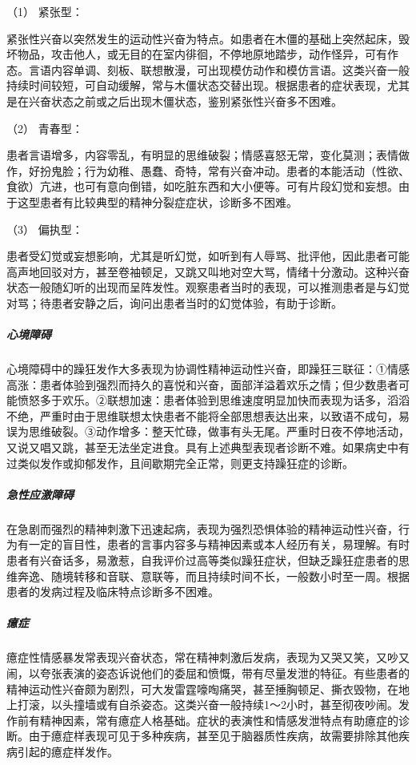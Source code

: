 \hypertarget{text00043.htmlux5cux23CHP1-18-1-2-1-1}{}
（1） 紧张型：

紧张性兴奋以突然发生的运动性兴奋为特点。如患者在木僵的基础上突然起床，毁坏物品，攻击他人，或无目的在室内徘徊，不停地原地踏步，动作怪异，可有作态。言语内容单调、刻板、联想散漫，可出现模仿动作和模仿言语。这类兴奋一般持续时间较短，可自动缓解，常与木僵状态交替出现。根据患者的症状表现，尤其是在兴奋状态之前或之后出现木僵状态，鉴别紧张性兴奋多不困难。

\hypertarget{text00043.htmlux5cux23CHP1-18-1-2-1-2}{}
（2） 青春型：

患者言语增多，内容零乱，有明显的思维破裂；情感喜怒无常，变化莫测；表情做作，好扮鬼脸；行为幼稚、愚蠢、奇特，常有兴奋冲动。患者的本能活动（性欲、食欲）亢进，也可有意向倒错，如吃脏东西和大小便等。可有片段幻觉和妄想。由于这型患者有比较典型的精神分裂症症状，诊断多不困难。

\hypertarget{text00043.htmlux5cux23CHP1-18-1-2-1-3}{}
（3） 偏执型：

患者受幻觉或妄想影响，尤其是听幻觉，如听到有人辱骂、批评他，因此患者可能高声地回驳对方，甚至卷袖顿足，又跳又叫地对空大骂，情绪十分激动。这种兴奋状态一般随幻听的出现而呈阵发性。观察患者当时的表现，可以推测患者是与幻觉对骂；待患者安静之后，询问出患者当时的幻觉体验，有助于诊断。

\subparagraph{心境障碍}

心境障碍中的躁狂发作大多表现为协调性精神运动性兴奋，即躁狂三联征：①情感高涨：患者体验到强烈而持久的喜悦和兴奋，面部洋溢着欢乐之情；但少数患者可能愤怒多于欢乐。②联想加速：患者体验到思维速度明显加快而表现为话多，滔滔不绝，严重时由于思维联想太快患者不能将全部思想表达出来，以致语不成句，易误为思维破裂。③动作增多：整天忙碌，做事有头无尾。严重时日夜不停地活动，又说又唱又跳，甚至无法坐定进食。具有上述典型表现者诊断不难。如果病史中有过类似发作或抑郁发作，且间歇期完全正常，则更支持躁狂症的诊断。

\subparagraph{急性应激障碍}

在急剧而强烈的精神刺激下迅速起病，表现为强烈恐惧体验的精神运动性兴奋，行为有一定的盲目性，患者的言事内容多与精神因素或本人经历有关，易理解。有时患者有兴奋话多，易激惹，自我评价过高等类似躁狂症状，但缺乏躁狂症患者的思维奔逸、随境转移和音联、意联等，而且持续时间不长，一般数小时至一周。根据患者的发病过程及临床特点诊断多不困难。

\subparagraph{癔症}

癔症性情感暴发常表现兴奋状态，常在精神刺激后发病，表现为又哭又笑，又吵又闹，以夸张表演的姿态诉说他们的委屈和愤慨，带有尽量发泄的特征。有些患者的精神运动性兴奋颇为剧烈，可大发雷霆嚎啕痛哭，甚至捶胸顿足、撕衣毁物，在地上打滚，以头撞墙或有自杀姿态。这类兴奋一般持续1～2小时，甚至彻夜吵闹。发作前有精神因素，常有癔症人格基础。症状的表演性和情感发泄特点有助癔症的诊断。由于癔症样表现可见于多种疾病，甚至见于脑器质性疾病，故需要排除其他疾病引起的癔症样发作。

